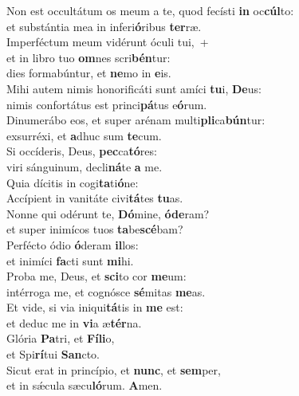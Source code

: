 \evenverse Non est occultátum os meum a te, quod fecísti \textbf{in} oc\textbf{cúl}to:~\*\\
\evenverse et substántia mea in inferi\textbf{ó}ribus \textbf{ter}ræ.\\
\oddverse Imperféctum meum vidérunt óculi tui,~+\\
\oddverse  et in libro tuo \textbf{om}nes scri\textbf{bén}tur:~\*\\
\oddverse dies formabúntur, et \textbf{ne}mo in \textbf{e}is.\\
\evenverse Mihi autem nimis honorificáti sunt amíci \textbf{tu}i, \textbf{De}us:~\*\\
\evenverse nimis confortátus est princi\textbf{pá}tus e\textbf{ó}rum.\\
\oddverse Dinumerábo eos, et super arénam multi\textbf{pli}ca\textbf{bún}tur:~\*\\
\oddverse exsurréxi, et \textbf{a}dhuc sum \textbf{te}cum.\\
\evenverse Si occíderis, Deus, \textbf{pec}ca\textbf{tó}res:~\*\\
\evenverse viri sánguinum, decli\textbf{ná}te \textbf{a} me.\\
\oddverse Quia dícitis in cogi\textbf{ta}ti\textbf{ó}ne:~\*\\
\oddverse Accípient in vanitáte civi\textbf{tá}tes \textbf{tu}as.\\
\evenverse Nonne qui odérunt te, \textbf{Dó}mine, \textbf{ó}\textbf{de}ram?~\*\\
\evenverse et super inimícos tuos \textbf{ta}be\textbf{scé}bam?\\
\oddverse Perfécto ódio \textbf{ó}deram \textbf{il}los:~\*\\
\oddverse et inimíci \textbf{fa}cti sunt \textbf{mi}hi.\\
\evenverse Proba me, Deus, et \textbf{sci}to cor \textbf{me}um:~\*\\
\evenverse intérroga me, et cognósce \textbf{sé}mitas \textbf{me}as.\\
\oddverse Et vide, si via iniqui\textbf{tá}tis in \textbf{me} est:~\*\\
\oddverse et deduc me in \textbf{vi}a æ\textbf{tér}na.\\
\evenverse Glória \textbf{Pa}tri, et \textbf{Fí}\textbf{li}o,~\*\\
\evenverse et Spi\textbf{rí}tui \textbf{San}cto.\\
\oddverse Sicut erat in princípio, et \textbf{nunc}, et \textbf{sem}per,~\*\\
\oddverse et in sǽcula sæcu\textbf{ló}rum. \textbf{A}men.\\
